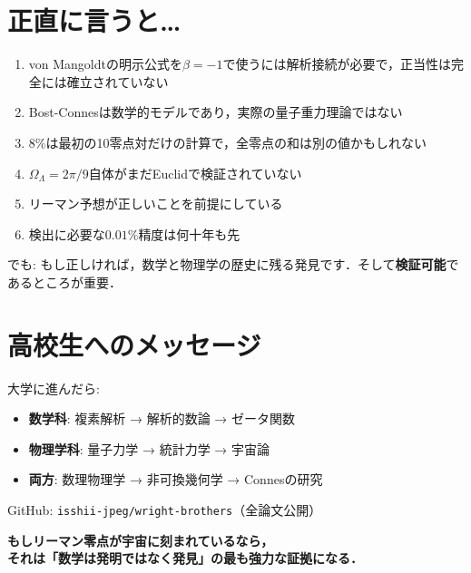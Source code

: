 \documentclass[11pt,a4paper]{article}
\begin{document}
\section{正直に言うと\ldots}
\begin{tcolorbox}[colback=red!5,colframe=red!50!black,title=注意すべき点]
\begin{enumerate}
\item von Mangoldtの明示公式を$\beta=-1$で使うには解析接続が必要で，正当性は完全には確立されていない
\item Bost-Connesは数学的モデルであり，実際の量子重力理論ではない
\item 8\%は最初の10零点対だけの計算で，全零点の和は別の値かもしれない
\item $\Omega_\Lambda = 2\pi/9$自体がまだEuclidで検証されていない
\item リーマン予想が正しいことを前提にしている
\item 検出に必要な$0.01\%$精度は何十年も先
\end{enumerate}
\end{tcolorbox}
でも: もし正しければ，数学と物理学の歴史に残る発見です．そして\textbf{検証可能}であるところが重要．

\section{高校生へのメッセージ}
大学に進んだら:
\begin{itemize}
\item \textbf{数学科}: 複素解析 → 解析的数論 → ゼータ関数
\item \textbf{物理学科}: 量子力学 → 統計力学 → 宇宙論
\item \textbf{両方}: 数理物理学 → 非可換幾何学 → Connesの研究
\end{itemize}
GitHub: \texttt{isshii-jpeg/wright-brothers}（全論文公開）

\begin{center}
\large\textbf{もしリーマン零点が宇宙に刻まれているなら，\\それは「数学は発明ではなく発見」の最も強力な証拠になる．}
\end{center}
\end{document}
